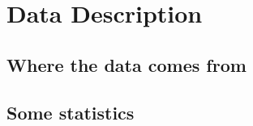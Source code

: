 \chapter{Data Description}%


\section{Where the data comes from}
\section{Some statistics}





\ifpdf
    \graphicspath{{Chapter3/Figs/Raster/}{Chapter3/Figs/PDF/}{Chapter3/Figs/}}
\else
    \graphicspath{{Chapter3/Figs/Vector/}{Chapter3/Figs/}}
\fi

